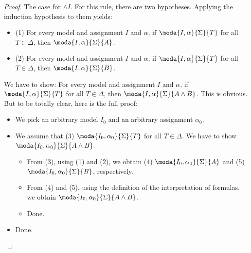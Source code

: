 \begin{proof}
\noindent The case for $\wedge I$. For this rule, there are two hypotheses. Applying the induction hypothesis to them yields:
\begin{itemize}
\item (1) For every model and assignment $I$ and $\alpha$, if $\moda{I,\alpha}{\Sigma}{T}$ for all $T\in\Delta$, then $\moda{I,\alpha}{\Sigma}{A}$.
\item (2) For every model and assignment $I$ and $\alpha$, if $\moda{I,\alpha}{\Sigma}{T}$ for all $T\in\Delta$, then $\moda{I,\alpha}{\Sigma}{B}$.
\end{itemize}
We have to show: For every model and assignment $I$ and $\alpha$, if $\moda{I,\alpha}{\Sigma}{T}$ for all $T\in\Delta$, then $\moda{I,\alpha}{\Sigma}{A\wedge B}$. This is obvious. But to be totally clear, here is the full proof:
\begin{itemize}
\item We pick an arbitrary model $I_0$ and an arbitrary assignment $\alpha_0$.
\item We assume that (3) $\moda{I_0,\alpha_0}{\Sigma}{T}$ for all $T\in\Delta$. We have to show $\moda{I_0,\alpha_0}{\Sigma}{A\wedge B}$.
\begin{itemize}
\item From (3), using (1) and (2), we obtain (4) $\moda{I_0,\alpha_0}{\Sigma}{A}$ and (5) $\moda{I_0,\alpha_0}{\Sigma}{B}$, respectively.
\item From (4) and (5), using the definition of the interpretation of formulas, we obtain $\moda{I_0,\alpha_0}{\Sigma}{A\wedge B}$.
\item Done.
\end{itemize}
\item Done.
\end{itemize}
\medskip


\end{proof}
